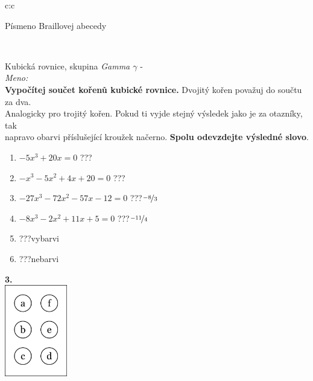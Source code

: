 \documentclass[10pt]{report}
\begin{document}
\begin{tabular}{c:c}
\begin{minipage}[c][99mm][t]{0.49\linewidth}
\begin{center}
\begin{minipage}{0.20\linewidth}
\begin{center}
{\small Písmeno Braillovej abecedy}
\end{center}
\end{minipage}
\end{center}
\end{minipage}
\\ \hdashline
\begin{minipage}[c][99mm][t]{0.49\linewidth}
\begin{center}
\vspace{7mm}
{\huge Kubická rovnice, skupina \textit{Gamma $\gamma$} -}\\[4.5mm]
\textit{Meno:}\phantom{xxxxxxxxxxxxxxxxxxxxxxxxxxxxxxxxxxxxxxxxxxxxxxxxxxxxxxxxxxxxxxxxx}\\[3.5mm]
\textbf{Vypočítej součet kořenů kubické rovnice.} Dvojitý kořen považuj do součtu za dva.\\Analogicky pro trojitý kořen. Pokud ti vyjde stejný výsledek jako je za otazníky, tak\\napravo obarvi příslušející kroužek načerno. \textbf{Spolu odevzdejte výsledné slovo}.\\[3mm]
\begin{minipage}{0.77\linewidth}
\begin{center}
\begin{varwidth}{\textwidth}
\begin{enumerate}
\large
\item $-5x^3+20x=0$\quad \dotfill\; ???\;\dotfill {}
\item $-x^3-5x^2+4x+20=0$\quad \dotfill\; ???\;\dotfill {}
\item $-27x^3-72x^2-57x-12=0$\quad \dotfill\; ???\;\dotfill \quad $\nicefrac{-8}{3}$
\item $-8x^3-2x^2+11x+5=0$\quad \dotfill\; ???\;\dotfill \quad $\nicefrac{-11}{4}$
\item \quad \dotfill\; ???\;\dotfill \quad vybarvi
\item \quad \dotfill\; ???\;\dotfill \quad nebarvi
\end{enumerate}
\end{varwidth}
\end{center}
\end{minipage}
\begin{minipage}{0.20\linewidth}
\begin{center}
{\Huge\bfseries 3.} \\[2mm]
\includegraphics[height=40mm]{../images/braille.png}

\end{center}
\end{minipage}
\end{center}
\end{minipage}
\end{tabular}
\end{document}
